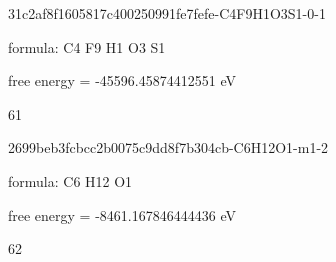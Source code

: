 \documentclass{article}
\begin{document}
\vspace{1cm}


31c2af8f1605817c400250991fe7fefe-C4F9H1O3S1-0-1



formula: C4 F9 H1 O3 S1



free energy = -45596.45874412551 eV

61

\vspace{1cm}


2699beb3fcbcc2b0075c9dd8f7b304cb-C6H12O1-m1-2



formula: C6 H12 O1



free energy = -8461.167846444436 eV

62
\end{document}
